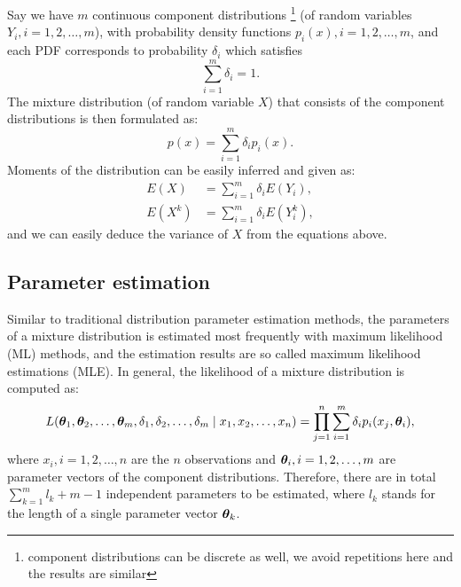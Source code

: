 Say we have $m$ continuous component distributions
\footnote{component distributions can be discrete as well,
we avoid repetitions here and the results are similar}
(of random variables $Y_i,i=1,2,\dots,m$), 
with probability density functions $p_i(x), i=1,2,\dots,m$,
and each PDF corresponds to probability $\delta_i$ which satisfies
		\begin{equation}
		\label{eq:preliminary:distribution:componentprob}
		\sum_{i=1}^{m} \delta_i = 1.
		\end{equation}
The mixture distribution (of random variable $X$) that 
consists of the component distributions is then formulated as:
		\begin{equation}
		\label{eq:preliminary:distribution:mixture}
		p(x) = \sum_{i=1}^{m} \delta_ip_i(x).
		\end{equation}
Moments of the distribution can be easily inferred and given as:
		\begin{subequations}
		\begin{align}
		E(X) & = \sum_{i=1}^{m} \delta_iE(Y_i),	\\
		E(X^k) & = \sum_{i=1}^{m} \delta_iE(Y_i^k),
		\end{align}
		\end{subequations}
and we can easily deduce the variance of $X$ from the equations above.


\subsection{Parameter estimation}
\label{sec:preliminary:distribution:parameter}
Similar to traditional distribution parameter estimation methods,
the parameters of a mixture distribution is estimated 
most frequently with maximum likelihood (ML) methods,
and the estimation results are so called maximum likelihood estimations (MLE).
In general, the likelihood of a mixture distribution is computed as:
		\begin{equation}
		\label{eq:preliminary:distribution:likelihood}
		L({\boldsymbol\theta}_1,{\boldsymbol\theta}_2,\dots,{\boldsymbol\theta}_m,\delta_1,\delta_2,\dots,\delta_m \mid x_1,x_2,\dots,x_n)
		= \prod_{j=1}^{n}\sum_{i=1}^{m} \delta_ip_i(x_j,{\boldsymbol\theta}_i),
		\end{equation}
where $x_i,i=1,2,\dots,n$ are the $n$ observations and 
${\boldsymbol\theta}_i,i=1,2,\dots,m$ are parameter vectors of the component distributions.
Therefore, there are in total $\sum_{k=1}^{m}l_k+m-1$ independent parameters to be estimated,
where $l_k$ stands for the length of a single parameter vector ${\boldsymbol\theta}_k$.

